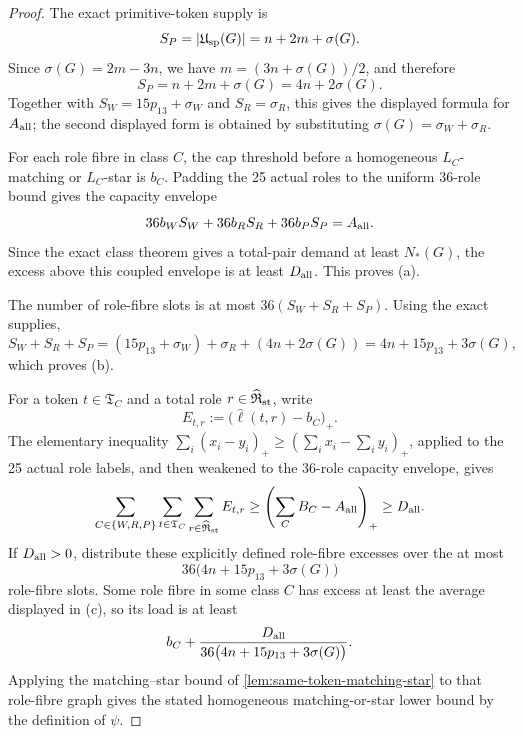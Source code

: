\documentclass[11pt]{article}
\begin{document}
\begin{proof}
The exact primitive-token supply is
\[
S_P=|\mathfrak U_{\rm sp}(G)|=n+2m+\sigma(G).
\]
Since \(\sigma(G)=2m-3n\), we have \(m=(3n+\sigma(G))/2\), and therefore
\[
S_P=n+2m+\sigma(G)=4n+2\sigma(G).
\]
Together with \(S_W=15p_{13}+\sigma_W\) and \(S_R=\sigma_R\), this gives the
displayed formula for \(A_{\rm all}\); the second displayed form is obtained by
substituting \(\sigma(G)=\sigma_W+\sigma_R\).

For each role fibre in class \(C\), the cap threshold before a homogeneous
\(L_C\)-matching or \(L_C\)-star is \(b_C\).  Padding the 25 actual roles to
the uniform 36-role bound gives the capacity envelope
\[
36b_WS_W+36b_RS_R+36b_PS_P=A_{\rm all}.
\]
Since the exact class theorem gives a total-pair demand at least \(N_*(G)\),
the excess above this coupled envelope is at least \(D_{\rm all}\).  This proves
(a).

The number of role-fibre slots is at most \(36(S_W+S_R+S_P)\).  Using the exact
supplies,
\[
S_W+S_R+S_P
=(15p_{13}+\sigma_W)+\sigma_R+(4n+2\sigma(G))
=4n+15p_{13}+3\sigma(G),
\]
which proves (b).

For a token \(t\in\mathfrak T_C\) and a total role
\(r\in\widehat{\mathfrak R}_{\rm st}\),
write
\[
E_{t,r}:=\bigl(\widehat\ell(t,r)-b_C\bigr)_+ .
\]
The elementary inequality \(\sum_i(x_i-y_i)_+\ge(\sum_i x_i-\sum_i y_i)_+\),
applied to the 25 actual role labels, and then weakened to the 36-role
capacity envelope, gives
\[
\sum_{C\in\{W,R,P\}}\sum_{t\in\mathfrak T_C}
\sum_{r\in\widehat{\mathfrak R}_{\rm st}}E_{t,r}
\ge
\left(
\sum_C B_C-A_{\rm all}
\right)_+
\ge D_{\rm all}.
\]
If \(D_{\rm all}>0\), distribute these explicitly defined role-fibre excesses
over the at most
\[
36\bigl(4n+15p_{13}+3\sigma(G)\bigr)
\]
role-fibre slots.  Some role fibre in some class \(C\) has excess at least the
average displayed in (c), so its load is at least
\[
b_C+
\frac{D_{\rm all}}
{36\bigl(4n+15p_{13}+3\sigma(G)\bigr)}.
\]
Applying the matching--star bound of \cref{lem:same-token-matching-star} to
that role-fibre graph gives the stated homogeneous matching-or-star lower
bound by the definition of \(\psi\).
\end{proof}
\end{document}
